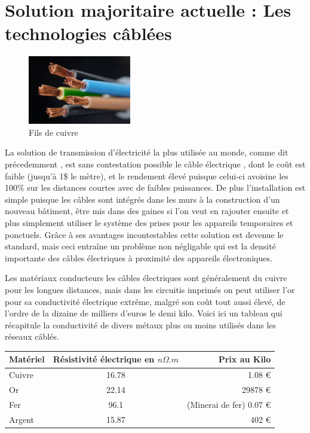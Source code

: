 \documentclass[12pt]{report}
\begin{document}
\newpage

\section{Solution majoritaire actuelle : Les technologies câblées}
\begin{figure}
  \begin{center}
    \includegraphics[width=0.4\textwidth]{copperWire}
  \end{center}
  \caption{Fils de cuivre}
\end{figure} La solution de transmission d'électricité la plus utilisée au monde, comme dit précedemment , est sans contestation possible le câble électrique , dont le coût est faible (jusqu'à 1\$ le mètre), et le rendement élevé puisque celui-ci avoisine les 100\% sur les distances courtes avec de faibles puissances. De plus l'installation est simple puisque les câbles sont intégrés dans les murs à la construction d'un nouveau bâtiment, être mis dans des gaines si l'on veut en rajouter ensuite et plus simplement utiliser le système des prises pour les appareils temporaires et ponctuels. Grâce à ses avantages incontestables cette solution est devenue le standard, mais ceci entraîne un problème non négligable qui est la densité importante des câbles électriques à proximité des appareils électroniques.
	
	Les matériaux conducteurs les câbles électriques sont généralement du cuivre pour les longues distances, mais dans les circuitis imprimés on peut utiliser l'or pour sa conductivité électrique extrême, malgré son coût tout aussi élevé, de l'ordre de la dizaine de milliers d'euros le demi kilo. Voici ici un tableau qui récapitule la conductivité de divers métaux plus ou moins utilisés dans les réseaux câblés.

\begin{center}
\begin{tabular}{| l | c | r |}
	\hline
	Matériel & Résistivité électrique en \( n\Omega .m \)& Prix au Kilo \\
	\hline
	Cuivre & 16.78 & 1.08 \euro{}  \\
	Or & 22.14 & 29878 \euro{}  \\
	Fer & 96.1 & (Minerai de fer) 0.07 \euro{}  \\
	Argent & 15.87 & 402 \euro{}  \\
	\hline
\end{tabular}
\end{center}
\end{document}
